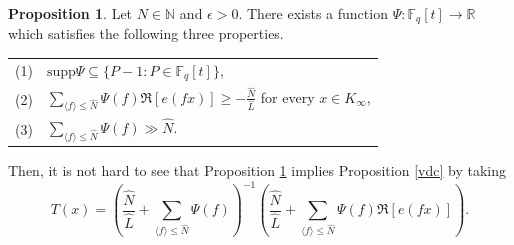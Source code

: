 \documentclass{article}
\theoremstyle{definition}
\newtheorem{prop}{Proposition}[section]
\theoremstyle{definition}
\theoremstyle{remark}
\newcommand{\R}{\mathbb{R}}
\newcommand{\N}{\mathbb{N}}
\newcommand{\F}{\mathbb{F}_q[t]}
\newcommand{\1}{\mathbf{1}}
\numberwithin{equation}{section}
\begin{document}
\begin{prop}\label{normalizedvdc}
Let $N\in \N$ and $\epsilon>0$. There exists a function $\Psi:\F\to \R$ which satisfies the following three properties. 

\begin{center}
\begin{tabular}{rl}
(1) & $\text{supp}\Psi\subseteq\{P-1: P\in \F\}$, \\
(2) & $\displaystyle \sum_{\langle f \rangle \leq \widehat{N}}\Psi(f)\Re[e(fx)]\geq -\frac{\widehat{N}}{\widehat{L}}$ for every $x \in K_\infty$, \\
(3) & $\displaystyle\sum_{\langle f \rangle \leq \widehat{N}}\Psi(f)\gg\widehat{N}$. \\
\end{tabular}
\end{center}
\end{prop}
Then, it is not hard to see that Proposition \ref{normalizedvdc} implies Proposition \ref{vdc} by taking 
\[T(x)=\left(\frac{\widehat{N}}{\widehat{L}}+\sum_{\langle f \rangle \leq \widehat{N}}\Psi(f) \right)^{-1}\left(\frac{\widehat{N}}{\widehat{L}}+\sum_{\langle f \rangle \leq \widehat{N}}\Psi(f)\Re[e(fx)]\right).\]
\end{document}
